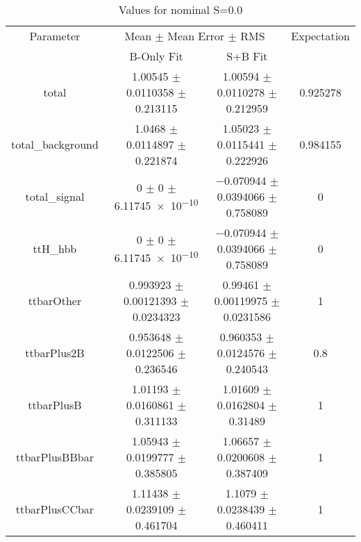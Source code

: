 \begin{table}
\centering
\caption{Values for nominal S=0.0}
\begin{tabular}{cccc}
\toprule
Parameter & \multicolumn{2}{c}{Mean $\pm$ Mean Error $\pm$ RMS} & Expectation\\
 & B-Only Fit & S+B Fit & \\
\midrule
total & \num{1.00545} $\pm$ \num{0.0110358} $\pm$ \num{0.213115} & \num{1.00594} $\pm$ \num{0.0110278} $\pm$ \num{0.212959} & \num{0.925278}\\
total\_background & \num{1.0468} $\pm$ \num{0.0114897} $\pm$ \num{0.221874} & \num{1.05023} $\pm$ \num{0.0115441} $\pm$ \num{0.222926} & \num{0.984155}\\
total\_signal & \num{0} $\pm$ \num{0} $\pm$ \num{6.11745e-10} & \num{-0.070944} $\pm$ \num{0.0394066} $\pm$ \num{0.758089} & \num{0}\\
ttH\_hbb & \num{0} $\pm$ \num{0} $\pm$ \num{6.11745e-10} & \num{-0.070944} $\pm$ \num{0.0394066} $\pm$ \num{0.758089} & \num{0}\\
ttbarOther & \num{0.993923} $\pm$ \num{0.00121393} $\pm$ \num{0.0234323} & \num{0.99461} $\pm$ \num{0.00119975} $\pm$ \num{0.0231586} & \num{1}\\
ttbarPlus2B & \num{0.953648} $\pm$ \num{0.0122506} $\pm$ \num{0.236546} & \num{0.960353} $\pm$ \num{0.0124576} $\pm$ \num{0.240543} & \num{0.8}\\
ttbarPlusB & \num{1.01193} $\pm$ \num{0.0160861} $\pm$ \num{0.311133} & \num{1.01609} $\pm$ \num{0.0162804} $\pm$ \num{0.31489} & \num{1}\\
ttbarPlusBBbar & \num{1.05943} $\pm$ \num{0.0199777} $\pm$ \num{0.385805} & \num{1.06657} $\pm$ \num{0.0200608} $\pm$ \num{0.387409} & \num{1}\\
ttbarPlusCCbar & \num{1.11438} $\pm$ \num{0.0239109} $\pm$ \num{0.461704} & \num{1.1079} $\pm$ \num{0.0238439} $\pm$ \num{0.460411} & \num{1}\\
\bottomrule
\end{tabular}
\end{table}